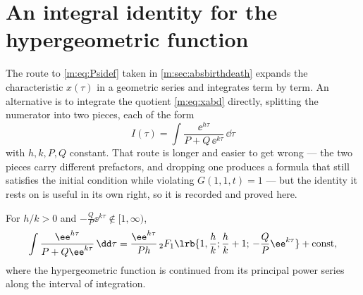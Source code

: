 \renewcommand{\thesection}{\thechapter.\Alph{section}}
\setcounter{section}{0}

\section{An integral identity for the hypergeometric function}
\label{m:app:hyp}

The route to \cref{m:eq:Psidef} taken in \cref{m:sec:absbirthdeath} expands the
characteristic $x(\tau)$ in a geometric series and integrates term by term. An
alternative is to integrate the quotient \cref{m:eq:xabd} directly, splitting the
numerator into two pieces, each of the form
\begin{equation}
\label{m:eq:Iform}
I(\tau) = \int\frac{\ee^{h\tau}}{P+Q\,\ee^{k\tau}}\,\dd\tau
\end{equation}
with $h,k,P,Q$ constant. That route is longer and easier to get wrong --- the two
pieces carry different prefactors, and dropping one produces a formula that still
satisfies the initial condition while violating $G(1,1,t)=1$ --- but the identity it
rests on is useful in its own right, so it is recorded and proved here.

\begin{proposition}
\label{m:prop:hypIden}
For $h/k>0$ and $-\tfrac{Q}{P}\ee^{k\tau}\notin[1,\infty)$,
\begin{equation}
\label{m:eq:hypIden}
\int\frac{\ee^{h\tau}}{P+Q\ee^{k\tau}}\,\dd\tau
= \frac{\ee^{h\tau}}{Ph}\,{}_2F_1\lrb{1,\frac{h}{k};\frac{h}{k}+1;\,-\frac{Q}{P}\ee^{k\tau}}
+ \text{const} ,
\end{equation}
where the hypergeometric function is continued from its principal power series
along the interval of integration.
\end{proposition}

